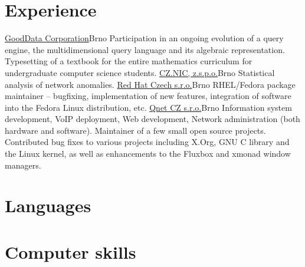 \documentclass[11pt,a4paper]{moderncv}
\begin{document}
\section{Experience}
    {\href{http://gooddata.com/}{GoodData Corporation}}{Brno}{}
    {Participation in an ongoing evolution of a query engine, the
    multidimensional query language and its algebraic representation.}
    {Typesetting of a textbook for the entire mathematics curriculum for
    undergraduate computer science students.}
    {\href{http://labs.nic.cz/}{CZ.NIC, z.s.p.o.}}{Brno}{}
    {Statistical analysis of network anomalies.}
    {\href{http://www.cz.redhat.com/}{Red Hat Czech s.r.o.}}{Brno}{}
    {RHEL/Fedora package maintainer -- bugfixing, implementation of new
    features, integration of software into the Fedora Linux distribution,
    etc.}
    {\href{http://www.qnet.cz/}{Qnet CZ s.r.o.}}{Brno}{}
    {Information system development, VoIP deployment, Web development, Network
    administration (both hardware and software).}
    {Maintainer of a few small open source projects. Contributed bug fixes to
    various projects including X.Org, GNU C library and the Linux kernel, as
    well as enhancements to the Fluxbox and xmonad window managers.}

\section{Languages}

\section{Computer skills}
\end{document}
